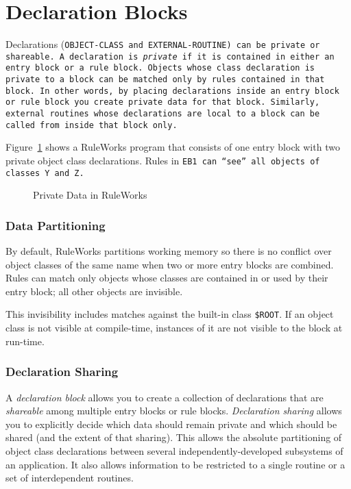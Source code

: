 \section{Declaration Blocks}

Declarations (\tt{OBJECT-CLASS} and \tt{EXTERNAL-ROUTINE}) can be
private or shareable.  A declaration is \emph{private} if it is
contained in either an entry block or a rule block. Objects whose
class declaration is private to a block can be matched only by rules
contained in that block. In other words, by placing declarations
inside an entry block or rule block you create private data for that
block. Similarly, external routines whose declarations are local to a
block can be called from inside that block only.

Figure~\ref{f:5-3} shows a RuleWorks program that consists of one
entry block with two private object class declarations. Rules in
\tt{EB1} can ``see'' all objects of classes \tt{Y} and \tt{Z}.

\begin{figure}[h]
  \centering
  
  \caption{Private Data in RuleWorks}
  \label{f:5-3}
\end{figure}

\subsubsection{Data Partitioning}

By default, RuleWorks partitions working memory so there is no
conflict over object classes of the same name when two or more entry
blocks are combined. Rules can match only objects whose classes are
contained in or used by their entry block; all other objects are
invisible.

This invisibility includes matches against the built-in class
\verb|$ROOT|. If an object class is not visible at compile-time,
instances of it are not visible to the block at run-time.

\subsubsection{Declaration Sharing}

A \emph{declaration block} allows you to create a collection of
declarations that are \emph{shareable} among multiple entry blocks or
rule blocks.  \emph{Declaration sharing} allows you to explicitly
decide which data should remain private and which should be shared
(and the extent of that sharing). This allows the absolute
partitioning of object class declarations between several
independently-developed subsystems of an application. It also allows
information to be restricted to a single routine or a set of
interdependent routines.

